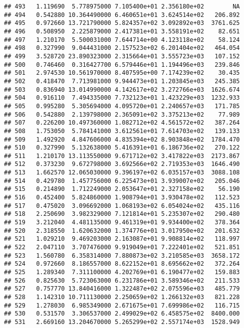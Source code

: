 \documentclass[
]{article}
\begin{document}
\begin{verbatim}
## 493   1.119690  5.778975000 7.105400e+01 2.356180e+02        NA
## 494   0.542880 10.364490000 6.460651e+01 3.624514e+02   206.892
## 495   0.972660 13.721790000 5.824357e+02 3.092892e+03  3761.625
## 496   0.508950  2.225879000 2.417381e+01 3.558191e+02    82.651
## 497   1.210170  5.500031000 7.644714e+00 4.123118e+02    58.124
## 498   0.327990  9.044431000 2.157523e+02 6.201404e+02   464.054
## 499   3.528720 23.890323000 2.315664e+01 3.555723e+03   107.152
## 500   0.746460  0.316427700 6.579446e+01 1.194496e+03   239.846
## 501   2.974530 10.561970000 8.407595e+00 7.174239e+02    30.435
## 502   0.418470  7.713981000 9.944473e+01 1.203845e+03   245.385
## 503   0.836940 13.014990000 4.142617e+02 3.272766e+03  1626.674
## 504   0.916110  7.494335000 7.732123e+01 1.423229e+03  1232.933
## 505   0.995280  5.305694000 4.095720e+01 2.240657e+03   171.785
## 506   0.542880  2.139798000 2.365091e+02 3.375213e+02    77.989
## 507   0.226200 10.497360000 1.082712e+02 4.561572e+02   387.264
## 508   1.753050  5.784141000 3.612561e+01 7.614703e+02   139.133
## 509   1.492920  4.847606000 4.835394e+02 8.903848e+02  1784.470
## 510   0.327990  5.132638000 5.416391e+01 6.186736e+02   270.122
## 511   1.210170 13.113550000 9.671712e+02 3.417822e+03  2173.867
## 512   0.373230  9.672798000 3.692566e+02 2.719353e+03  1646.490
## 513   1.662570 12.065030000 9.396197e+02 6.035157e+03  3088.108
## 514   0.429780  1.457756000 6.225473e+01 3.939007e+02   205.046
## 515   0.214890  1.712249000 2.053647e+01 2.327158e+02    56.190
## 516   0.452400  5.824860000 1.908794e+01 3.930478e+02   112.523
## 517   0.475020  3.096692000 1.068193e+02 6.054024e+02   435.116
## 518   2.250690  3.982329000 7.121814e+01 5.235307e+02   290.480
## 519   3.212040  4.481135000 9.461319e+01 9.934400e+02   378.364
## 520   2.318550  1.620632000 1.374776e+01 3.017950e+02   201.632
## 521   1.029210  9.469203000 2.163087e+01 9.908814e+02   118.997
## 522   2.047110  3.707476000 9.919049e+01 7.222401e+02   521.851
## 523   1.560780  6.358314000 7.880873e+02 3.210585e+03  3658.172
## 524   0.972660  8.186557000 8.622152e+01 8.695662e+02   372.264
## 525   1.289340  7.311100000 4.202769e+01 6.190477e+02   159.883
## 526   0.825630  5.723063000 6.231786e+01 3.589346e+02   211.533
## 527   0.757770 13.840416000 1.322487e+02 2.075596e+03   485.779
## 528   1.142310 10.711130000 2.250659e+02 1.266132e+03   821.228
## 529   1.278030  6.985349000 2.671675e+01 7.699986e+02   116.715
## 530   0.531570  3.306537000 2.499029e+02 6.458575e+02  8400.000
## 531   2.669160 13.204670000 5.265299e+02 2.557174e+03  1528.949

\end{verbatim}
\end{document}
